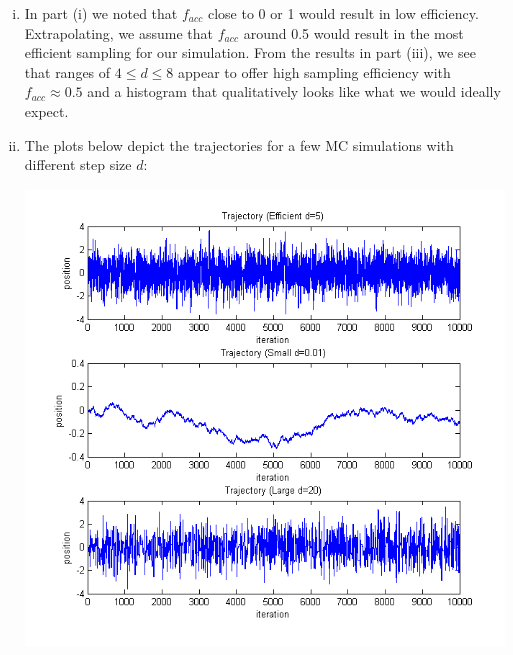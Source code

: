 \documentclass{article}
\begin{document}
\begin{enumerate}[i.]
  \item In part (i) we noted that $f_{acc}$ close to 0 or 1 would result in low efficiency. Extrapolating, we assume that $f_{acc}$ around 0.5 would result in the most efficient sampling for our simulation. From the results in part (iii), we see that ranges of $4 \leq d \leq 8$ appear to offer high sampling efficiency with $f_{acc} \approx 0.5$ and a histogram that qualitatively looks like what we would ideally expect.

  \item The plots below depict the trajectories for a few MC simulations with different step size $d$:
    \begin{center}
      \includegraphics[scale=0.7]{prob2e}
    \end{center}

\end{enumerate}
\end{document}
